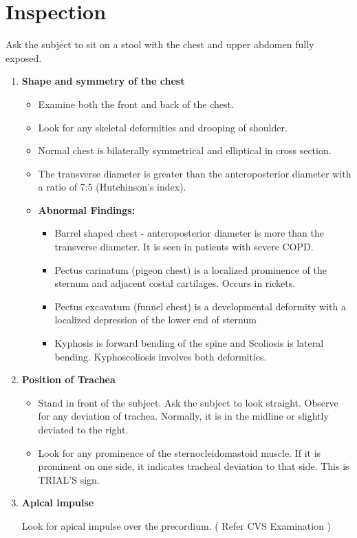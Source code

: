\documentclass[a4paper,12pt,openany,oneside]{book}
\begin{document}
\section*{Inspection}
Ask the subject to sit on a stool with the chest and upper abdomen fully exposed.
\begin{enumerate}
\item{\textbf{Shape and symmetry of the chest}}
	\begin{itemize}
\item{Examine both the front and back of the chest.}
\item{Look for any skeletal deformities and drooping of shoulder.}
\item{Normal chest is bilaterally symmetrical and elliptical in cross section.}
\item{The transverse diameter is greater than the anteroposterior diameter with a ratio of 7:5  (Hutchinson’s index).}
\item[]\textbf{Abnormal Findings:}
	\begin{itemize}
\item{			Barrel shaped chest - anteroposterior diameter is more than the transverse diameter. It is seen in patients with severe COPD.}
\item{Pectus carinatum (pigeon chest) is a localized prominence of the sternum and adjacent costal cartilages. Occurs in rickets.}
\item{Pectus excavatum (funnel chest) is a developmental deformity with a localized depression of the lower end of sternum}
\item{Kyphosis is forward bending of the spine and Scoliosis is lateral bending. Kyphoscoliosis involves both deformities.}
	\end{itemize}
	\end{itemize}
\item{\textbf{Position of Trachea}}
	\begin{itemize}
\item{Stand in front of the subject. Ask the subject to look straight. Observe for any deviation of trachea. Normally, it is in the midline or slightly deviated to the right.}
\item{Look for any prominence of the sternocleidomastoid muscle. If it is prominent on one side, it indicates tracheal deviation to that side. This is TRIAL’S sign.}
	\end{itemize}
\item{\textbf{Apical impulse}\par Look for apical impulse over the precordium. ( Refer CVS Examination )}

\end{enumerate}
\end{document}

